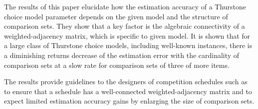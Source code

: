The results of this paper elucidate how the estimation accuracy of a Thurstone choice model parameter depends on the given model and the structure of comparison sets. They show that a key factor is the algebraic connectivity of a weighted-adjacency matrix, which is specific to given model. It is shown that for a large class of Thurstone choice models, including well-known instances, there is a diminishing returns decrease of the estimation error with the cardinality of comparison sets at a slow rate for comparison sets of three of more items. 

The results provide guidelines to the designers of competition schedules such as to ensure that a schedule has a well-connected weighted-adjacency matrix and to expect limited estimation accuracy gains by enlarging the size of comparison sets.

